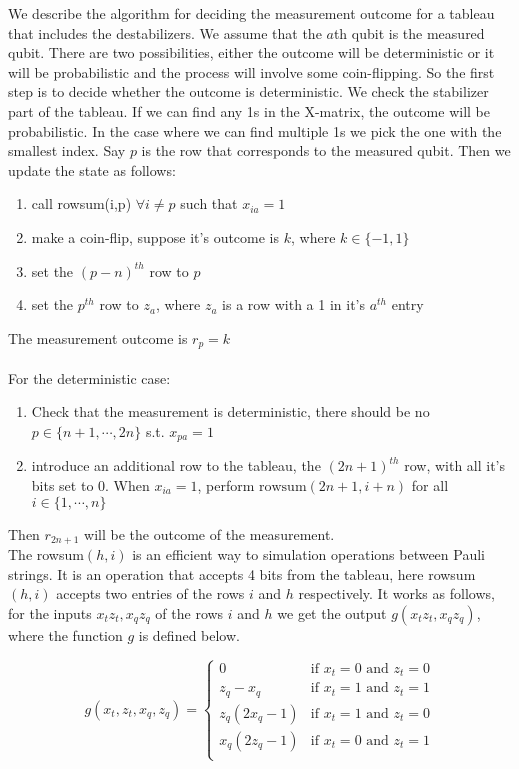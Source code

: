 We describe the algorithm for deciding the measurement outcome for a tableau that includes the destabilizers. We assume that the $a$th qubit is the measured qubit. There are two possibilities, either the outcome will be deterministic or it will be probabilistic and the process will involve some coin-flipping. So the first step is to decide whether the outcome is deterministic. We check the stabilizer part of the tableau. If we can find any 1s in the X-matrix, the outcome will be probabilistic. In the case where we can find multiple 1s we pick the one with the smallest index. Say $p$ is the row that corresponds to the measured qubit. Then we update the state as follows:
\begin{enumerate}
	\item call rowsum(i,p) $\forall i\neq p$ such that $x_{ia}=1$
	\item make a coin-flip, suppose it's outcome is $k$, where $k\in\{ -1,1 \}$
	\item set the $(p-n)^{th}$ row to $p$
	\item set the $p^{th}$ row to $z_a$, where $z_a$ is a row with a 1 in it's $a^{th}$ entry 
\end{enumerate} 
The measurement outcome is $r_p=k$\\\\

For the deterministic case:

\begin{enumerate}
	\item Check that the measurement is deterministic, there should be no $p\in \{ n+1 , \cdots , 2n \}$ s.t. $x_{pa}=1$
	\item introduce an additional row to the tableau, the $(2n+1)^{th}$ row, with all it's bits set to 0. When $x_{ia}=1$, perform $\text{rowsum}(2n+1,i+n)$ for all $i\in \{ 1, \cdots , n \}$ 
\end{enumerate}
Then $r_{2n+1}$ will be the outcome of the measurement.\\ 

The rowsum$(h,i)$ is an efficient way to simulation operations between Pauli strings. It is an operation that accepts 4 bits from the tableau, here rowsum$(h,i)$ accepts two entries of the rows $i$ and $h$ respectively. It works as follows, for the inputs $x_t z_t, x_q z_q $ of the rows $i$ and $h$ we get the output $g(x_t z_t, x_q z_q)$, where the function $g$ is defined below.

\begin{equation}
	g(x_t, z_t, x_q, z_q) =
	\begin{cases}
		0 & \text{if } x_t = 0 \text{ and } z_t = 0 \\
		z_q - x_q & \text{if } x_t = 1 \text{ and } z_t = 1 \\
		z_q(2x_q - 1) & \text{if } x_t = 1 \text{ and } z_t = 0 \\
		x_q(2z_q - 1) & \text{if } x_t = 0 \text{ and } z_t = 1 \\
	\end{cases}
\end{equation}

